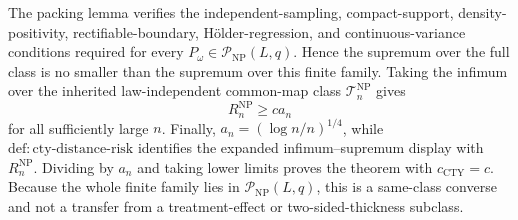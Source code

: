 The packing lemma verifies the independent-sampling, compact-support, density-positivity, rectifiable-boundary, H\"older-regression, and continuous-variance conditions required for every \(P_\omega\in\mathcal P_{\mathrm{NP}}(L,q)\).  Hence the supremum over the full class is no smaller than the supremum over this finite family.  Taking the infimum over the inherited law-independent common-map class \(\mathcal T_n^{\mathrm{NP}}\) gives
\[
 R_n^{\mathrm{NP}}\geq c a_n
\]
for all sufficiently large \(n\).  Finally, \(a_n=(\log n/n)^{1/4}\), while \(\mathrm{def:cty\text{-}distance\text{-}risk}\) identifies the expanded infimum--supremum display with \(R_n^{\mathrm{NP}}\).  Dividing by \(a_n\) and taking lower limits proves the theorem with \(c_{\mathrm{CTY}}=c\).  Because the whole finite family lies in \(\mathcal P_{\mathrm{NP}}(L,q)\), this is a same-class converse and not a transfer from a treatment-effect or two-sided-thickness subclass.